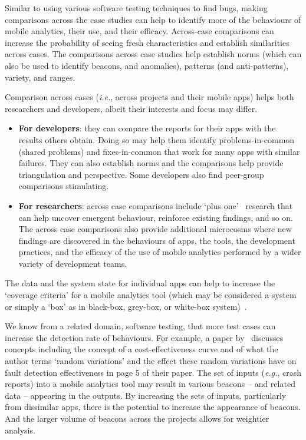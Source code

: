 Similar to using various software testing techniques to find bugs, making comparisons across the case studies can help to identify more of the behaviours of mobile analytics, their use, and their efficacy. Across-case comparisons can increase the probability of seeing fresh characteristics and establish similarities across cases. The comparisons across case studies help establish norms (which can also be used to identify beacons, and anomalies), patterns (and anti-patterns), variety, and ranges. 

Comparison across cases (\textit{i.e.}, across projects and their mobile apps) helps both researchers and developers, albeit their interests and focus may differ.

\begin{itemize}
    \item \textbf{For developers}: they can compare the reports for their apps with the results others obtain. Doing so may help them identify problems-in-common (shared problems) and fixes-in-common that work for many apps with similar failures. They can also establish norms and the comparisons help provide triangulation and perspective. Some developers also find peer-group comparisons stimulating.
    
    \item \textbf{For researchers}: across case comparisons include `plus one'~ research that can help uncover emergent behaviour, reinforce existing findings, and so on. The across case comparisons also provide additional microcosms where new findings are discovered in the behaviours of apps, the tools, the development practices, and the efficacy of the use of mobile analytics performed by a wider variety of development teams.
\end{itemize}


The data and the system state for individual apps can help to increase the `coverage criteria' for a mobile analytics tool (which may be considered a system or simply a `box' as in black-box, grey-box, or white-box system)~. 

We know from a related domain, software testing, that more test cases can increase the detection rate of behaviours. For example, a paper by~ discusses concepts including the concept of a cost-effectiveness curve and of what the author terms `random variations' and the effect these random variations have on fault detection effectiveness in page 5 of their paper. The set of inputs (\textit{e.g.}, crash reports) into a mobile analytics tool may result in various beacons -- and related data -- appearing in the outputs. By increasing the sets of inputs, particularly from dissimilar apps, there is the potential to increase the appearance of beacons. And the larger volume of beacons across the projects allows for weightier analysis.

